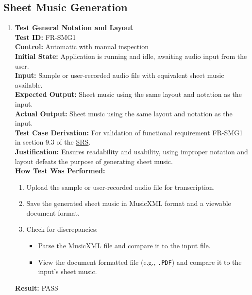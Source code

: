 \documentclass[12pt, titlepage]{article}
\begin{document}
  \subsection{Sheet Music Generation}
  \begin{enumerate}
  \item \textbf{Test General Notation and Layout} \\
    \newline
    \textbf{Test ID:} FR-SMG1 \\
    \textbf{Control:} Automatic with manual inspection \\
    \textbf{Initial State:} Application is running and idle, awaiting audio input from the user. \\
    \textbf{Input:} Sample or user-recorded audio file with equivalent sheet music available. \\
    \textbf{Expected Output:} Sheet music using the same layout and notation as the input. \\
    \textbf{Actual Output:} Sheet music using the same layout and notation as the input. \\
    \textbf{Test Case Derivation:} For validation of functional requirement FR-SMG1 in section 9.3 of the 
    \href{https://github.com/emilyperica/ScoreGen/blob/main/docs/SRS-Volere/SRS.pdf}{SRS}. \\
    \textbf{Justification:} Ensures readability and usability, using improper notation and layout defeats the purpose of 
    generating sheet music. \\
    \textbf{How Test Was Performed:}
    \begin{enumerate}
        \item Upload the sample or user-recorded audio file for transcription.
        \item Save the generated sheet music in MusicXML format and a viewable document format.
        \item Check for discrepancies:
        \begin{itemize}
            \item Parse the MusicXML file and compare it to the input file.
            \item View the document formatted file (e.g., \texttt{.PDF}) and compare it to the input’s sheet music.
        \end{itemize}
    \end{enumerate}
    \textbf{Result:} PASS
  

\end{enumerate}
\end{document}

